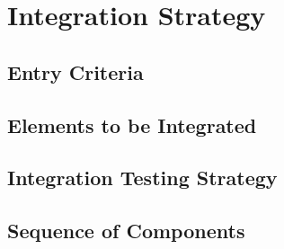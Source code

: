 \section{Integration Strategy} %
\label{sec:integration_strategy}

\subsection{Entry Criteria} %
\label{sub:entry_criteria}

\subsection{Elements to be Integrated} %
\label{sub:elements_to_be_integrated}

\subsection{Integration Testing Strategy} %
\label{sub:integration_testing_strategy}

\subsection{Sequence of Components} %
\label{sub:sequence_of_components}


